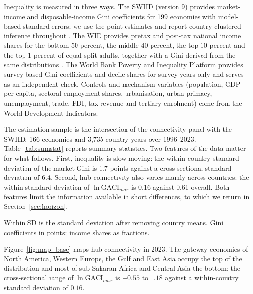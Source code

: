 \documentclass[12pt]{article}
\begin{document}
Inequality is measured in three ways. The SWIID (version 9) provides market-income and disposable-income Gini coefficients for 199 economies with model-based standard errors; we use the point estimates and report country-clustered inference throughout \citep{Solt_2020}. The WID provides pretax and post-tax national income shares for the bottom 50 percent, the middle 40 percent, the top 10 percent and the top 1 percent of equal-split adults, together with a Gini derived from the same distributions \citep{WID_2024}. The World Bank Poverty and Inequality Platform provides survey-based Gini coefficients and decile shares for survey years only and serves as an independent check. Controls and mechanism variables (population, GDP per capita, sectoral employment shares, urbanisation, urban primacy, unemployment, trade, FDI, tax revenue and tertiary enrolment) come from the World Development Indicators.

The estimation sample is the intersection of the connectivity panel with the SWIID: 166 economies and 3,735 country-years over 1996--2023. Table~\ref{tab:sumstat} reports summary statistics. Two features of the data matter for what follows. First, inequality is slow moving: the within-country standard deviation of the market Gini is 1.7 points against a cross-sectional standard deviation of 6.4. Second, hub connectivity also varies mainly across countries: the within standard deviation of $\ln\mathrm{GACI}_{max}$ is 0.16 against 0.61 overall. Both features limit the information available in short differences, to which we return in Section~\ref{sec:horizon}.

\begin{table}[H]\centering\caption{Summary statistics, estimation sample (166 economies, 1996--2023).}\label{tab:sumstat}
\begin{threeparttable}\small
\begin{tablenotes}\footnotesize\item Within SD is the standard deviation after removing country means. Gini coefficients in points; income shares as fractions.\end{tablenotes}\end{threeparttable}\end{table}

Figure~\ref{fig:map_base} maps hub connectivity in 2023. The gateway economies of North America, Western Europe, the Gulf and East Asia occupy the top of the distribution and most of sub-Saharan Africa and Central Asia the bottom; the cross-sectional range of $\ln\mathrm{GACI}_{max}$ is $-0.55$ to $1.18$ against a within-country standard deviation of $0.16$.
\end{document}
